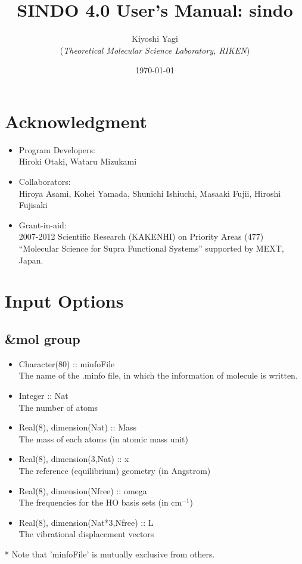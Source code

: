 \documentclass[a4paper,12pt]{article}
\title{{\huge S{\LARGE INDO} 4.0 User's Manual: sindo} }
\author{Kiyoshi Yagi \\ ({\it Theoretical Molecular Science Laboratory, RIKEN})}
\date{\today}
\begin{document}
\maketitle

\newpage
\tableofcontents

\newpage

\section*{Acknowledgment}

\begin{itemize}
  \item Program Developers: \\
	Hiroki Otaki, Wataru Mizukami

  \item Collaborators: \\
	Hiroya Asami, Kohei Yamada, Shunichi Ishiuchi, Masaaki Fujii, Hiroshi Fujisaki

  \item Grant-in-aid: \\
	2007-2012 Scientific Research (KAKENHI) on Priority Areas (477)  ``Molecular Science for Supra Functional Systems'' supported by MEXT, Japan.	
  
\end{itemize}

\newpage

\section{Input Options}
\subsection{\&mol group}
   \begin{itemize}
     \item Character(80) :: minfoFile \\
       The name of the .minfo file, in which the information of molecule is written.
     \item Integer :: Nat \\
       The number of atoms
     \item Real(8), dimension(Nat) :: Mass \\
       The mass of each atoms (in atomic mass unit)
     \item Real(8), dimension(3,Nat) :: x \\
       The reference (equilibrium) geometry (in Angstrom)
     \item Real(8), dimension(Nfree) :: omega \\
       The frequencies for the HO basis sets (in $\mathrm{cm^{-1}}$) 
     \item Real(8), dimension(Nat*3,Nfree) :: L \\
       The vibrational displacement vectors 
   \end{itemize}
* Note that 'minfoFile' is mutually exclusive from others. 
\end{document}
